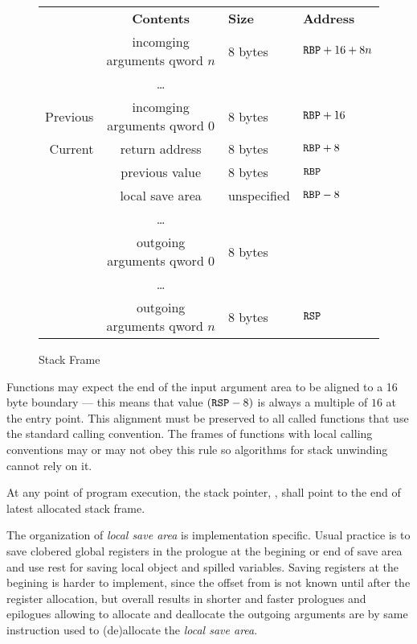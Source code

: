 \begin{figure}
\caption{Stack Frame}
\label{fig-stack-frame}
\begin{center}
\begin{tabular}{r|cl|l}
\noalign{\smallskip}
\multicolumn{1}{l}{\bf Frame} &
\multicolumn{1}{c}{\bf Contents} &
\multicolumn{1}{l}{\bf Size} &
\multicolumn{1}{l}{\bf Address} \\
\noalign{\smallskip}  \cline{2-3}
& incomging arguments qword $n$ & 8 bytes & ${\tt{RBP}}+16+8n$ \\
& \dots & & \\
Previous& incomging arguments qword $0$ & 8 bytes & ${\tt{RBP}}+16$ \\ \cline{1-4} 
Current & return address & 8 bytes & ${\tt{RBP}}+8$\\ \cline{2-3}
& previous \RBP{} value & 8 bytes & ${\tt{RBP}}$ \\ \cline{2-3}
& local save area & unspecified & ${\tt{RBP}}-8$\\ 
& \dots & & \\ \cline {2-3}
& outgoing arguments qword $0$ & 8 bytes &\\
& \dots & & \\
& outgoing arguments qword $n$ & 8 bytes & ${\tt{RSP}}$ \\ \cline{2-3}
\end{tabular}
\end{center}
\end{figure}


Functions may expect the end of the input argument area to be aligned
to a 16 byte boundary --- this means that value $({\tt{RSP}} - 8)$ is always a
multiple of $16$ at the entry point. This alignment must be preserved to
all called functions that use the standard calling convention. The
frames of functions with local calling conventions may or may not obey
this rule so algorithms for stack unwinding cannot rely on it.

At any point of program execution, the stack pointer, \RSP, shall point to
the end of latest allocated stack frame.

The organization of \emph{local save area} is implementation specific. Usual
practice is to save clobered global registers in the prologue at the begining
or end of save area and use rest for saving local object and spilled variables.
Saving registers at the begining is harder to implement, since the offset
from \RBP{} is not known until after the register allocation, but overall results
in shorter and faster prologues and epilogues allowing to allocate and deallocate
the outgoing arguments are by same instruction used to (de)allocate the \emph{local
save area}.

